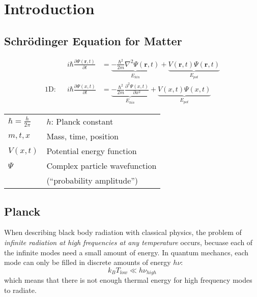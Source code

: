 \section{Introduction}

\subsection{Schrödinger Equation for Matter}
\begin{align*}
               &  & i\hbar \frac{\partial \Psi(\mathbf{r},t)}{\partial t} & = \underbrace{- \frac{\hbar^2}{2m} \nabla^2 \Psi(\mathbf{r},t)}_{E_{kin}} + \underbrace{V(\mathbf{r},t)\Psi(\mathbf{r},t)}_{E_{pot}} \\
    \text{1D:} &  & i\hbar \frac{\partial \Psi(x,t)}{\partial t}          & = \underbrace{- \frac{\hbar^2}{2m} \frac{\partial^2 \Psi(x,t)}{\partial x^2}}_{E_{kin}} + \underbrace{V(x,t)\Psi(x,t)}_{E_{pot}}
\end{align*}

\renewcommand{\arraystretch}{1.3}
\setlength\tabcolsep{6pt} %
\begin{tabularx}{\linewidth}{@{}ll@{}}
    $\hbar = \frac{h}{2\pi}$ & $h$: Planck constant          \\
    $m,t,x$                  & Mass, time, position          \\
    $V(x,t)$                 & Potential energy function     \\
    $\Psi$                   & Complex particle wavefunction \\
                             & (``probability amplitude'')     \\
\end{tabularx}
\renewcommand{\arraystretch}{1}
\setlength\tabcolsep{6pt} %

\subsection{Planck}
When describing black body radiation with classical physics, the problem of \textit{infinite radiation at
    high frequencies at any temperature} occurs, becuase each of the infinite modes need a small amount of energy.
In quantum mechancs, each mode can only be filled in discrete amounts of energy $h \nu$:
\begin{equation*}
    k_B T_{low} \ll h\nu_{high}
\end{equation*}
which means that there is not enough thermal energy for high frequency modes to radiate.
